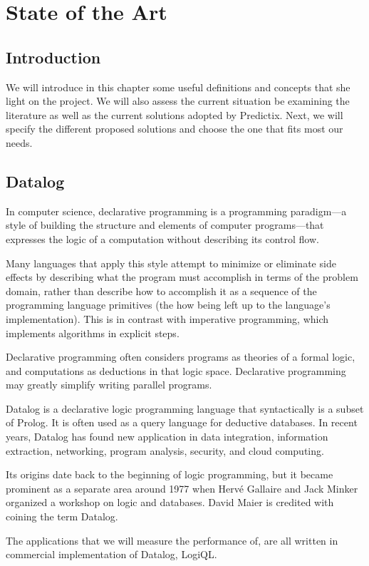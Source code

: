 \chapter{State of the Art}


\section*{Introduction}
We will introduce in this chapter some useful definitions and concepts that she
light on the project. We will also assess the current situation be examining
the literature as well as the current solutions adopted by Predictix. Next, we
will specify the different proposed solutions and choose the one that fits most
our needs.
\pagebreak

\section{Datalog}
In computer science, declarative programming is a programming paradigm—a style
of building the structure and elements of computer programs—that expresses the
logic of a computation without describing its control flow.

Many languages that apply this style attempt to minimize or eliminate side
effects by describing what the program must accomplish in terms of the problem
domain, rather than describe how to accomplish it as a sequence of the
programming language primitives (the how being left up to the language's
implementation). This is in contrast with imperative programming, which
implements algorithms in explicit steps.

Declarative programming often considers programs as theories of a formal logic,
and computations as deductions in that logic space. Declarative programming may
greatly simplify writing parallel programs.

Datalog is a declarative logic programming language that syntactically is a
subset of Prolog. It is often used as a query language for deductive databases.
In recent years, Datalog has found new application in data integration,
information extraction, networking, program analysis, security, and cloud
computing.

Its origins date back to the beginning of logic programming, but it became
prominent as a separate area around 1977 when Hervé Gallaire and Jack Minker
organized a workshop on logic and databases. David Maier is credited with
coining the term Datalog.

The applications that we will measure the performance of, are all written in
commercial implementation of Datalog, LogiQL.

